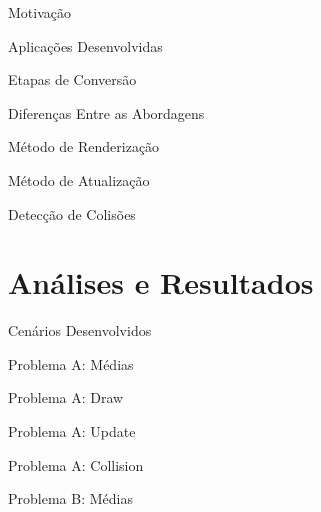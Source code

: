 \documentclass{beamer}
\begin{document}
\frame{\tableofcontents[currentsection]}

\begin{frame}[t]{Motivação}
\end{frame}

\begin{frame}[t]{Aplicações Desenvolvidas}
\end{frame}

\begin{frame}[t]{Etapas de Conversão}
\end{frame}

\begin{frame}[t]{Diferenças Entre as Abordagens}
\end{frame}

\begin{frame}[t]{Método de Renderização}
\end{frame}

\begin{frame}[t]{Método de Atualização}
\end{frame}

\begin{frame}[t]{Detecção de Colisões}
\end{frame}

\section{Análises e Resultados}

\frame{\tableofcontents[currentsection]}

\begin{frame}[t]{Cenários Desenvolvidos}
\end{frame}

\begin{frame}[t]{Problema A: Médias}
\end{frame}

\begin{frame}[t]{Problema A: Draw}
\end{frame}

\begin{frame}[t]{Problema A: Update}
\end{frame}

\begin{frame}[t]{Problema A: Collision}
\end{frame}

\begin{frame}[t]{Problema B: Médias}
\end{frame}
\end{document}
